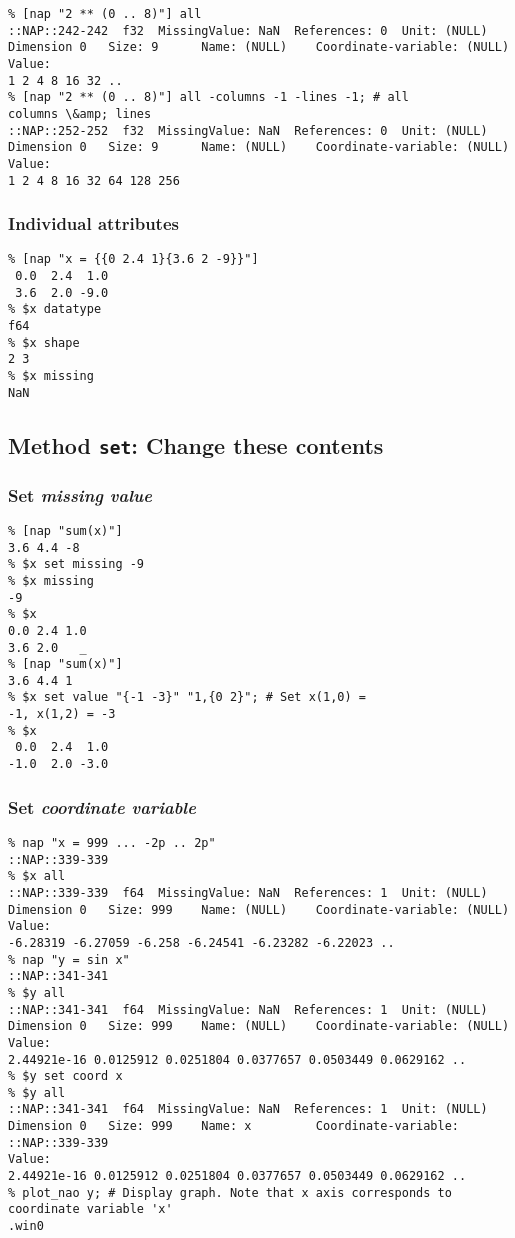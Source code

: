     \begin{verbatim}
% [nap "2 ** (0 .. 8)"] all
::NAP::242-242  f32  MissingValue: NaN  References: 0  Unit: (NULL)
Dimension 0   Size: 9      Name: (NULL)    Coordinate-variable: (NULL)
Value:
1 2 4 8 16 32 ..
% [nap "2 ** (0 .. 8)"] all -columns -1 -lines -1; # all
columns \&amp; lines
::NAP::252-252  f32  MissingValue: NaN  References: 0  Unit: (NULL)
Dimension 0   Size: 9      Name: (NULL)    Coordinate-variable: (NULL)
Value:
1 2 4 8 16 32 64 128 256
\end{verbatim}

    \subsubsection{Individual attributes}

    \begin{verbatim}
% [nap "x = {{0 2.4 1}{3.6 2 -9}}"]
 0.0  2.4  1.0
 3.6  2.0 -9.0
% $x datatype
f64
% $x shape
2 3
% $x missing
NaN
\end{verbatim}

    \subsection{
      \label{set}Method \texttt{set}: Change these contents
    }

    \subsubsection{Set 
    \emph{missing value}}

    \begin{verbatim}
% [nap "sum(x)"]
3.6 4.4 -8
% $x set missing -9
% $x missing
-9
% $x 
0.0 2.4 1.0
3.6 2.0   _
% [nap "sum(x)"]
3.6 4.4 1
% $x set value "{-1 -3}" "1,{0 2}"; # Set x(1,0) =
-1, x(1,2) = -3
% $x
 0.0  2.4  1.0
-1.0  2.0 -3.0
\end{verbatim}

    \subsubsection{Set 
    \emph{coordinate variable}}

    \begin{verbatim}
% nap "x = 999 ... -2p .. 2p"
::NAP::339-339
% $x all
::NAP::339-339  f64  MissingValue: NaN  References: 1  Unit: (NULL)
Dimension 0   Size: 999    Name: (NULL)    Coordinate-variable: (NULL)
Value:
-6.28319 -6.27059 -6.258 -6.24541 -6.23282 -6.22023 ..
% nap "y = sin x"
::NAP::341-341
% $y all
::NAP::341-341  f64  MissingValue: NaN  References: 1  Unit: (NULL)
Dimension 0   Size: 999    Name: (NULL)    Coordinate-variable: (NULL)
Value:
2.44921e-16 0.0125912 0.0251804 0.0377657 0.0503449 0.0629162 ..
% $y set coord x
% $y all
::NAP::341-341  f64  MissingValue: NaN  References: 1  Unit: (NULL)
Dimension 0   Size: 999    Name: x         Coordinate-variable:
::NAP::339-339
Value:
2.44921e-16 0.0125912 0.0251804 0.0377657 0.0503449 0.0629162 ..
% plot_nao y; # Display graph. Note that x axis corresponds to
coordinate variable 'x'
.win0
\end{verbatim}


